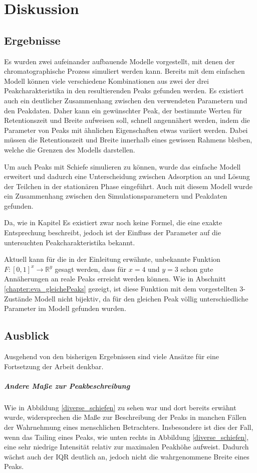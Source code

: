 \chapter{Diskussion}
\label{chapter:dis}

\section{Ergebnisse}
Es wurden zwei aufeinander aufbauende Modelle vorgestellt, mit denen der chromatographische Prozess simuliert werden kann. Bereits mit dem einfachen Modell können viele verschiedene Kombinationen aus zwei der drei Peakcharakteristika in den resultierenden Peaks gefunden werden. Es existiert auch ein deutlicher Zusammenhang zwischen den verwendeten Parametern und den Peakdaten. Daher kann ein gewünschter Peak, der bestimmte Werten für Retentionszeit und Breite aufweisen soll, schnell angennähert werden, indem die Parameter von Peaks mit ähnlichen Eigenschaften etwas variiert werden. Dabei müssen die Retentionszeit und Breite innerhalb eines gewissen Rahmens bleiben, welche die Grenzen des Modells darstellen.

Um auch Peaks mit Schiefe simulieren zu können, wurde das einfache Modell erweitert und dadurch eine Unterscheidung zwischen Adsorption an und Lösung der Teilchen in der stationären Phase eingeführt. Auch mit diesem Modell wurde ein Zusammenhang zwischen den Simulationsparametern und Peakdaten gefunden. 

Da, wie in Kapitel 
Es existiert zwar noch keine Formel, die eine exakte Entsprechung beschreibt, jedoch ist der Einfluss der Parameter auf die untersuchten Peakcharakteristika bekannt. 

Aktuell kann für die in der Einleitung erwähnte, unbekannte Funktion  $F: [0,1] ^ x \rightarrow \mathbb{R}^y$ gesagt werden, dass für $x = 4$ und $y = 3$ schon gute Annäherungen an reale Peaks erreicht werden können.
Wie in Abschnitt \ref{chapter:eva_gleichePeaks} gezeigt, ist diese Funktion mit dem vorgestellten 3-Zustände Modell nicht bijektiv, da für den gleichen Peak völlig unterschiedliche Parameter im Modell gefunden wurden.


\section{Ausblick}
Ausgehend von den bisherigen Ergebnissen sind viele Ansätze für eine Fortsetzung der Arbeit denkbar.

\paragraph{Andere Maße zur Peakbeschreibung}
Wie in Abbildung \ref{diverse_schiefen} zu sehen war und dort bereits erwähnt wurde, widersprechen die Maße zur Beschreibung der Peaks in manchen Fällen der Wahrnehmung eines menschlichen Betrachters. Insbesondere ist dies der Fall, wenn das Tailing eines Peaks, wie unten rechts in Abbildung \ref{diverse_schiefen}, eine sehr niedrige Intensität relativ zur maximalen Peakhöhe aufweist. Dadurch wächst auch der IQR deutlich an, jedoch nicht die wahrgenommene Breite eines Peaks.

